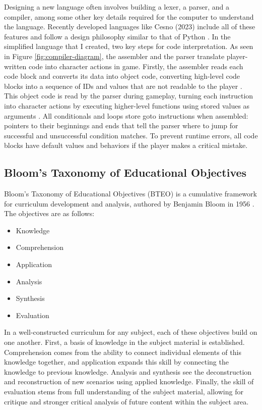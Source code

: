 \documentclass[10pt,twocolumn]{article}
\begin{document}
Designing a new language often involves building a lexer, a parser, and a compiler, among some other key details required for the computer to understand the language. Recently developed languages like Cesno (2023) include all of these features and follow a design philosophy similar to that of Python \cite{cesno-language}. In the simplified language that I created, two key steps for code interpretation. As seen in Figure \ref{fig:compiler-diagram}, the assembler and the parser translate player-written code into character actions in game. Firstly, the assembler reads each code block and converts its data into object code, converting high-level code blocks into a sequence of IDs and values that are not readable to the player \cite{assembly-textbook}. This object code is read by the parser during gameplay, turning each instruction into character actions by executing higher-level functions using stored values as arguments \cite{compiler-textbook}. All conditionals and loops store goto instructions when assembled: pointers to their beginnings and ends that tell the parser where to jump for successful and unsuccessful condition matches. To prevent runtime errors, all code blocks have default values and behaviors if the player makes a critical mistake.

\subsection{Bloom's Taxonomy of Educational Objectives}
Bloom’s Taxonomy of Educational Objectives (BTEO) is a cumulative framework for curriculum development and analysis, authored by Benjamin Bloom in 1956 \cite{bloom-taxonomy}. The objectives are as follows:

\begin{itemize}
    \item Knowledge
    \item Comprehension
    \item Application
    \item Analysis
    \item Synthesis
    \item Evaluation
\end{itemize}

In a well-constructed curriculum for any subject, each of these objectives build on one another. First, a basis of knowledge in the subject material is established. Comprehension comes from the ability to connect individual elements of this knowledge together, and application expands this skill by connecting the knowledge to previous knowledge. Analysis and synthesis see the deconstruction and reconstruction of new scenarios using applied knowledge. Finally, the skill of evaluation stems from full understanding of the subject material, allowing for critique and stronger critical analysis of future content within the subject area. 
\end{document}
